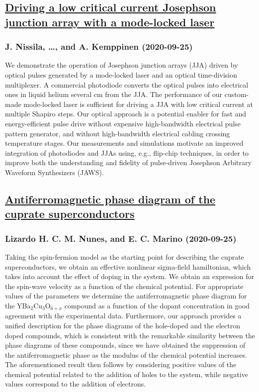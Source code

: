\subsection*{\href{http://arxiv.org/abs/2009.12352v1}{Driving a low critical current Josephson junction array with a  mode-locked laser}}
\subsubsection*{J. Nissila, \dots, and A. Kemppinen (2020-09-25)}
We demonstrate the operation of Josephson junction arrays (JJA) driven by
optical pulses generated by a mode-locked laser and an optical time-division
multiplexer. A commercial photodiode converts the optical pulses into
electrical ones in liquid helium several cm from the JJA. The performance of
our custom-made mode-locked laser is sufficient for driving a JJA with low
critical current at multiple Shapiro steps. Our optical approach is a potential
enabler for fast and energy-efficient pulse drive without expensive
high-bandwidth electrical pulse pattern generator, and without high-bandwidth
electrical cabling crossing temperature stages. Our measurements and
simulations motivate an improved integration of photodiodes and JJAs using,
e.g., flip-chip techniques, in order to improve both the understanding and
fidelity of pulse-driven Josephson Arbitrary Waveform Synthesizers (JAWS).

\subsection*{\href{http://arxiv.org/abs/2009.14030v1}{Antiferromagnetic phase diagram of the cuprate superconductors}}
\subsubsection*{Lizardo H. C. M. Nunes, and E. C. Marino (2020-09-25)}
Taking the spin-fermion model as the starting point for describing the
cuprate superconductors, we obtain an effective nonlinear sigma-field
hamiltonian, which takes into account the effect of doping in the system. We
obtain an expression for the spin-wave velocity as a function of the chemical
potential. For appropriate values of the parameters we determine the
antiferromagnetic phase diagram for the YBa$_2$Cu$_3$O$_{6+x}$ compound as a
function of the dopant concentration in good agreement with the experimental
data. Furthermore, our approach provides a unified description for the phase
diagrams of the hole-doped and the electron doped compounds, which is
consistent with the remarkable similarity between the phase diagrams of these
compounds, since we have obtained the suppression of the antiferromagnetic
phase as the modulus of the chemical potential increases. The aforementioned
result then follows by considering positive values of the chemical potential
related to the addition of holes to the system, while negative values
correspond to the addition of electrons.

